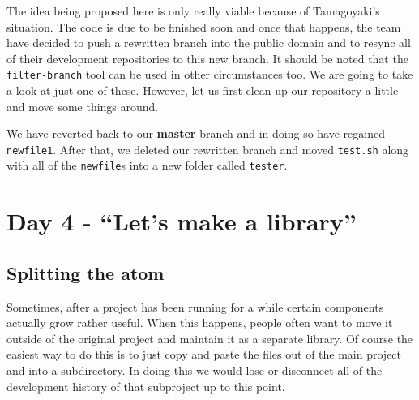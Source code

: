 {The idea being proposed here is only really viable because of Tamagoyaki's situation.
The code is due to be finished soon and once that happens, the team have decided to push a rewritten branch into the public domain and to resync all of their development repositories to this new branch.
It should be noted that the \texttt{filter-branch} tool can be used in other circumstances too.
We are going to take a look at just one of these.
However, let us first clean up our repository a little and move some things around.


We have reverted back to our \textbf{master} branch and in doing so have regained \texttt{newfile1}.
After that, we deleted our rewritten branch and moved \texttt{test.sh} along with all of the \texttt{newfile}s into a new folder called \texttt{tester}.

\section{Day 4 - ``Let's make a library''}
\subsection{Splitting the atom}
Sometimes, after a project has been running for a while certain components actually grow rather useful.
When this happens, people often want to move it outside of the original project and maintain it as a separate library.
Of course the easiest way to do this is to just copy and paste the files out of the main project and into a subdirectory.
In doing this we would lose or disconnect all of the development history of that subproject up to this point.

}
